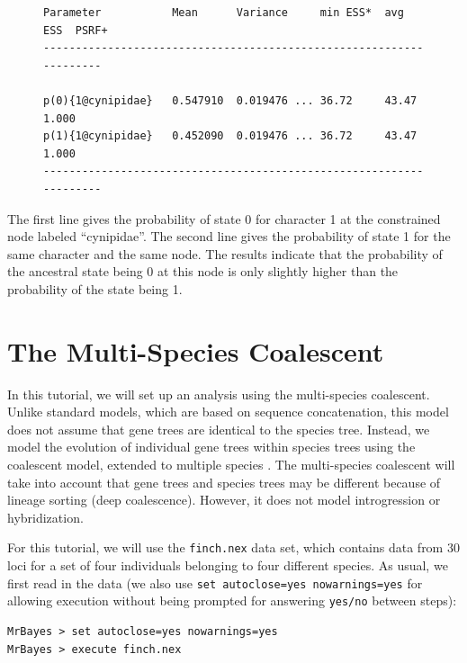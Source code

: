 \documentclass[12pt]{book}
\begin{document}
\begin{figure}[h]
\centering
\begin{BVerbatim}
Parameter           Mean      Variance     min ESS*  avg ESS  PSRF+
--------------------------------------------------------------------

p(0){1@cynipidae}   0.547910  0.019476 ... 36.72     43.47    1.000
p(1){1@cynipidae}   0.452090  0.019476 ... 36.72     43.47    1.000
--------------------------------------------------------------------
\end{BVerbatim}
\end{figure}

The first line gives the probability of state 0 for character 1 at the constrained node labeled
``cynipidae''. The second line gives the probability of state 1 for the same character and the same
node. The results indicate that the probability of the ancestral state being 0 at this node is only
slightly higher than the probability of the state being 1.

\section{The Multi-Species Coalescent}\label{theMultiSpeciesCoalescent}

In this tutorial, we will set up an analysis using the multi-species coalescent. Unlike standard
models, which are based on sequence concatenation, this model does not assume that gene trees are
identical to the species tree. Instead, we model the evolution of individual gene trees within
species trees using the coalescent model, extended to multiple species \citep{liu07,edwards07}. The
multi-species coalescent will take into account that gene trees and species trees may be different
because of lineage sorting (deep coalescence). However, it does not model introgression or
hybridization.

For this tutorial, we will use the \texttt{finch.nex} data set, which contains data from 30 loci
for a set of four individuals belonging to four different species. As usual, we first read in the
data (we also use \texttt{set autoclose=yes nowarnings=yes} for allowing execution without being
prompted for answering \texttt{yes/no} between steps):

\begin{Verbatim}
MrBayes > set autoclose=yes nowarnings=yes
MrBayes > execute finch.nex
\end{Verbatim}
\end{document}

